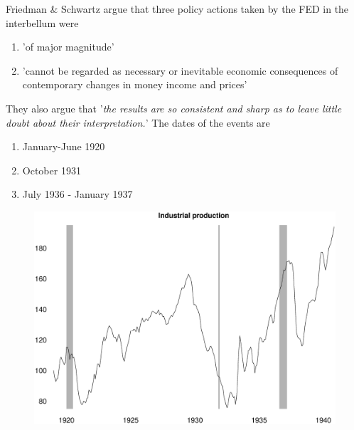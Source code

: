 \documentclass{beamer}
\begin{document}
\begin{frame}
  Friedman \& Schwartz argue that three policy actions taken by the FED in the interbellum were
  \begin{enumerate}
    \item 'of major magnitude'
    \item 'cannot be regarded as necessary or inevitable economic consequences of contemporary changes in money income and prices'
  \end{enumerate}
  \medskip
  They also argue that '\textit{the results are so consistent and sharp as to leave little doubt about their interpretation.}'
  The dates of the events are
  \begin{enumerate}
    \item January-June 1920
    \item October 1931
    \item July 1936 - January 1937
  \end{enumerate}
\end{frame}

\begin{frame}
  \begin{figure}
    \includegraphics[scale=.3]{industrial_production.eps}
  \end{figure}
\end{frame}
\end{document}
